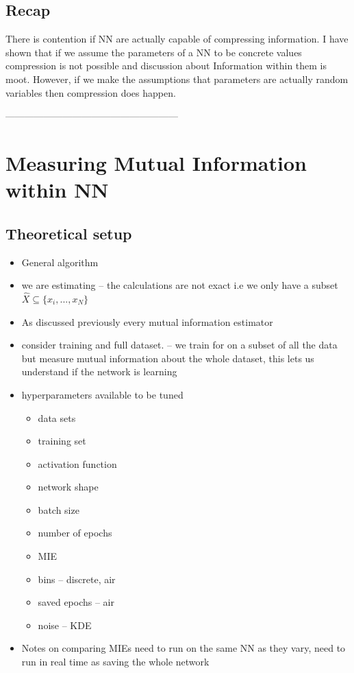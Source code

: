 \documentclass[dissertation.tex]{subfiles}
\begin{document}
\subsection{Recap}

There is contention if NN are actually capable of compressing information. 
I have shown that if we assume the parameters of a NN to be concrete values
compression is not possible and discussion about Information within them is
moot. However, if we make the assumptions that parameters are actually random
variables then compression does happen.

------------------------------------------------------

\section{Measuring Mutual Information within NN}

\subsection{Theoretical setup}

\begin{itemize}
  \item{
      General algorithm
    }
  \item{
      we are estimating -- the calculations are not exact i.e we only have a
      subset $\hat{X}\subseteq\{x_i,...,x_N\}$
    }
  \item{
      As discussed previously every mutual information estimator
    }
  \item{
      consider training and full dataset. -- we train for on a subset of all the
      data but measure mutual information about the whole dataset, this lets us
      understand if the network is learning
    }
  \item{
      hyperparameters available to be tuned 
      \begin{itemize}
        \item{
            data sets
          }
        \item{
            training set
          }
        \item{
            activation function
          }
        \item{
            network shape
          }
        \item{
            batch size
          }
        \item{
            number of epochs
          }
        \item{
            MIE
          }
        \item{
            bins -- discrete, air
          }
        \item{
            saved epochs -- air
          }
        \item{
            noise -- KDE
          }
      \end{itemize}
    }
  \item{
      Notes on comparing MIEs need to run on the same NN as they vary, need to
      run in real time as saving the whole network
    }
\end{itemize}
\end{document}
